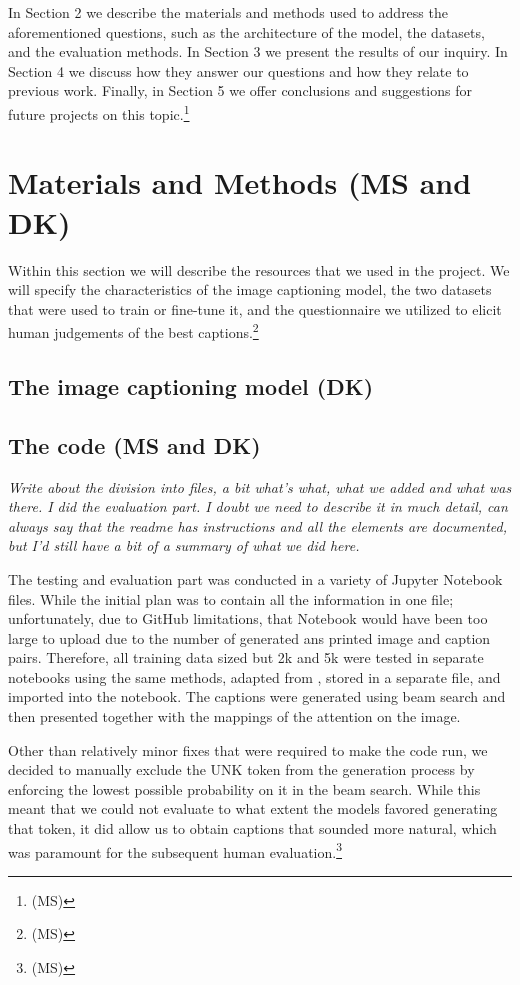 \documentclass[11pt]{article}
\begin{document}
In Section 2 we describe the materials and methods used to address the aforementioned questions, such as the architecture of the model, the datasets, and the evaluation methods. In Section 3 we present the results of our inquiry. In Section 4 we discuss how they answer our questions and how they relate to previous work. Finally, in Section 5 we offer conclusions and suggestions for future projects on this topic.\footnote{(MS)}

\section{Materials and Methods (MS and DK)}

Within this section we will describe the resources that we used in the project. We will specify the characteristics of the image captioning model, the two datasets that were used to train or fine-tune it, and the questionnaire we utilized to elicit human judgements of the best captions.\footnote{(MS)}

\subsection{The image captioning model (DK)}
\subsection{The code (MS and DK)}

\textit{Write about the division into files, a bit what's what, what we added and what was there. I did the evaluation part. I doubt we need to describe it in much detail, can always say that the readme has instructions and all the elements are documented, but I'd still have a bit of a summary of what we did here.}

The testing and evaluation part was conducted in a variety of Jupyter Notebook files. While the initial plan was to contain all the information in one file; unfortunately, due to GitHub limitations, that Notebook would have been too large to upload due to the number of generated ans printed image and caption pairs. Therefore, all training data sized but 2k and 5k were tested in separate notebooks using the same methods, adapted from \cite{ilinykh}, stored in a separate file, and imported into the notebook. The captions were generated using beam search and then presented together with the mappings of the attention on the image.

Other than relatively minor fixes that were required to make the code run, we decided to manually exclude the UNK token from the generation process by enforcing the lowest possible probability on it in the beam search. While this meant that we could not evaluate to what extent the models favored generating that token, it did allow us to obtain captions that sounded more natural, which was paramount for the subsequent human evaluation.\footnote{(MS)} 
\end{document}
